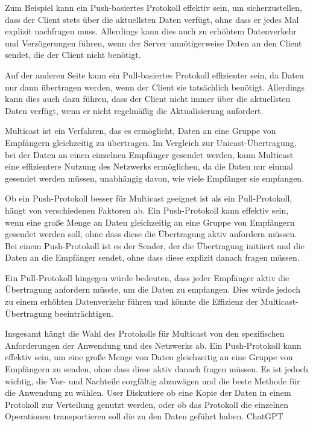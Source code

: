 Zum Beispiel kann ein Push-basiertes Protokoll effektiv sein, um sicherzustellen, dass der Client stets über die aktuellsten Daten verfügt, ohne dass er jedes Mal explizit nachfragen muss. Allerdings kann dies auch zu erhöhtem Datenverkehr und Verzögerungen führen, wenn der Server unnötigerweise Daten an den Client sendet, die der Client nicht benötigt.

Auf der anderen Seite kann ein Pull-basiertes Protokoll effizienter sein, da Daten nur dann übertragen werden, wenn der Client sie tatsächlich benötigt. Allerdings kann dies auch dazu führen, dass der Client nicht immer über die aktuellsten Daten verfügt, wenn er nicht regelmäßig die Aktualisierung anfordert.

Multicast ist ein Verfahren, das es ermöglicht, Daten an eine Gruppe von Empfängern gleichzeitig zu übertragen. Im Vergleich zur Unicast-Übertragung, bei der Daten an einen einzelnen Empfänger gesendet werden, kann Multicast eine effizientere Nutzung des Netzwerks ermöglichen, da die Daten nur einmal gesendet werden müssen, unabhängig davon, wie viele Empfänger sie empfangen.

Ob ein Push-Protokoll besser für Multicast geeignet ist als ein Pull-Protokoll, hängt von verschiedenen Faktoren ab. Ein Push-Protokoll kann effektiv sein, wenn eine große Menge an Daten gleichzeitig an eine Gruppe von Empfängern gesendet werden soll, ohne dass diese die Übertragung aktiv anfordern müssen. Bei einem Push-Protokoll ist es der Sender, der die Übertragung initiiert und die Daten an die Empfänger sendet, ohne dass diese explizit danach fragen müssen.

Ein Pull-Protokoll hingegen würde bedeuten, dass jeder Empfänger aktiv die Übertragung anfordern müsste, um die Daten zu empfangen. Dies würde jedoch zu einem erhöhten Datenverkehr führen und könnte die Effizienz der Multicast-Übertragung beeinträchtigen.

Insgesamt hängt die Wahl des Protokolls für Multicast von den spezifischen Anforderungen der Anwendung und des Netzwerks ab. Ein Push-Protokoll kann effektiv sein, um eine große Menge von Daten gleichzeitig an eine Gruppe von Empfängern zu senden, ohne dass diese aktiv danach fragen müssen. Es ist jedoch wichtig, die Vor- und Nachteile sorgfältig abzuwägen und die beste Methode für die Anwendung zu wählen.
User
Diskutiere ob eine Kopie der Daten in einem Protokoll zur Verteilung genutzt werden, oder ob das Protokoll die einzelnen Operationen transportieren soll die zu den Daten geführt haben. 
ChatGPT

